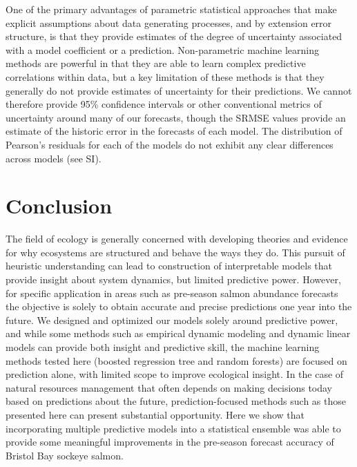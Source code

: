 \documentclass[
]{article}
\begin{document}
One of the primary advantages of parametric statistical approaches that make explicit assumptions about data generating processes, and by extension error structure, is that they provide estimates of the degree of uncertainty associated with a model coefficient or a prediction. Non-parametric machine learning methods are powerful in that they are able to learn complex predictive correlations within data, but a key limitation of these methods is that they generally do not provide estimates of uncertainty for their predictions. We cannot therefore provide 95\% confidence intervals or other conventional metrics of uncertainty around many of our forecasts, though the SRMSE values provide an estimate of the historic error in the forecasts of each model. The distribution of Pearson's residuals for each of the models do not exhibit any clear differences across models (see SI).

\hypertarget{conclusion}{%
\section{Conclusion}\label{conclusion}}

The field of ecology is generally concerned with developing theories and evidence for why ecosystems are structured and behave the ways they do. This pursuit of heuristic understanding can lead to construction of interpretable models that provide insight about system dynamics, but limited predictive power. However, for specific application in areas such as pre-season salmon abundance forecasts the objective is solely to obtain accurate and precise predictions one year into the future. We designed and optimized our models solely around predictive power, and while some methods such as empirical dynamic modeling and dynamic linear models can provide both insight and predictive skill, the machine learning methods tested here (boosted regression tree and random forests) are focused on prediction alone, with limited scope to improve ecological insight. In the case of natural resources management that often depends on making decisions today based on predictions about the future, prediction-focused methods such as those presented here can present substantial opportunity. Here we show that incorporating multiple predictive models into a statistical ensemble was able to provide some meaningful improvements in the pre-season forecast accuracy of Bristol Bay sockeye salmon.
\end{document}
